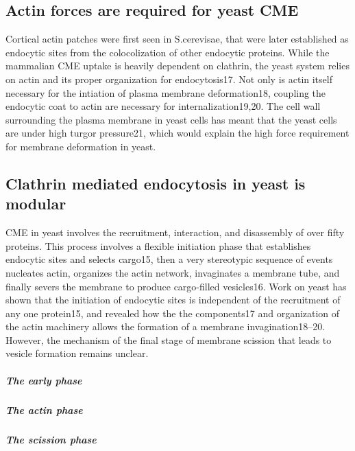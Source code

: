 		\subsection{Actin forces are required for yeast CME}
Cortical actin patches were first seen in S.cerevisae, that were later established as endocytic sites from the colocolization of other endocytic proteins. While the mammalian CME uptake is heavily dependent on clathrin, the yeast system relies on actin and its proper organization for endocytosis17. Not only is actin itself necessary for the intiation of plasma membrane deformation18, coupling the endocytic coat to actin are necessary for internalization19,20.  The cell wall surrounding the plasma membrane in yeast cells has meant that the yeast cells are under high turgor pressure21, which would explain the high force requirement for membrane deformation in yeast. 

	
		\subsection{Clathrin mediated endocytosis in yeast is modular}
	CME in yeast involves the recruitment, interaction, and disassembly of over fifty proteins. This process involves a flexible initiation phase that establishes endocytic sites and selects cargo15, then a very stereotypic sequence of events nucleates actin, organizes the actin network, invaginates a membrane tube, and finally severs the membrane to produce cargo-filled vesicles16. Work on yeast has shown that the initiation of endocytic sites is independent of the recruitment of any one protein15, and revealed how the the components17 and organization of the actin machinery allows the formation of a membrane invagination18–20. However, the mechanism of the final stage of membrane scission that leads to vesicle formation remains unclear.

		\subparagraph{The early phase}
		\subparagraph{The actin phase}
		\subparagraph{The scission phase}
		
		
